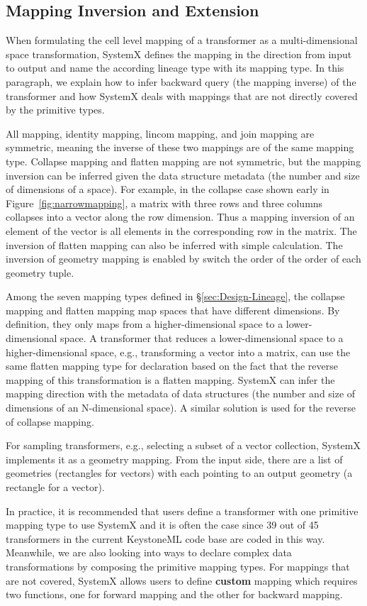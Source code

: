 \documentclass{sig-alternate}
\begin{document}
\subsection{Mapping Inversion and Extension}
When formulating the cell level mapping of a transformer as a multi-dimensional space transformation, SystemX defines
the mapping in the direction from input to output and name the according lineage type with its mapping type.
In this paragraph, we explain how to infer backward query (the mapping inverse) of the transformer and how SystemX deals
with mappings that are not directly covered by the primitive types.

All mapping, identity mapping, lincom mapping, and join mapping are symmetric, 
meaning the inverse of these two mappings are of the same mapping type.
Collapse mapping and flatten mapping are not symmetric, but the mapping inversion can be inferred
given the data structure metadata (the number and size of dimensions of a space). For example, 
in the collapse case shown early in Figure~\ref{fig:narrowmapping}, a matrix with three rows and three columns
collapses into a vector along the row dimension. Thus a mapping inversion of an element of the vector
is all elements in the corresponding row in the matrix. 
The inversion of flatten mapping can also be inferred with simple calculation.
The inversion of geometry mapping is enabled by switch the order of the order of each geometry tuple.


Among the seven mapping types defined in \S\ref{sec:Design-Lineage}, the collapse mapping and flatten mapping
map spaces that have different dimensions. By definition, they only maps from a higher-dimensional space to a lower-dimensional space.
A transformer that reduces a lower-dimensional space to a higher-dimensional space, e.g., transforming a vector into a matrix, can use
the same flatten mapping type for declaration based on the fact that the reverse mapping of this transformation is a
flatten mapping. SystemX can infer the mapping direction with the metadata of data structures 
(the number and size of dimensions of an N-dimensional space). 
A similar solution is used for the reverse of collapse mapping.

For sampling transformers, e.g., selecting a subset of a vector collection, SystemX implements it as a geometry mapping.
From the input side, there are a list of geometries (rectangles for vectors) with each pointing to an output geometry (a rectangle for a vector).

In practice, it is recommended that users define a transformer with one primitive mapping type to use SystemX and it is often the case since
39 out of 45 transformers in the current KeystoneML code base are coded in this way. 
Meanwhile, we are also looking into ways to declare complex data transformations by composing the primitive mapping types.
For mappings that are not covered, SystemX allows users to define {\bf custom} mapping
which requires two functions, one for forward mapping and the other for backward mapping.
\end{document}

